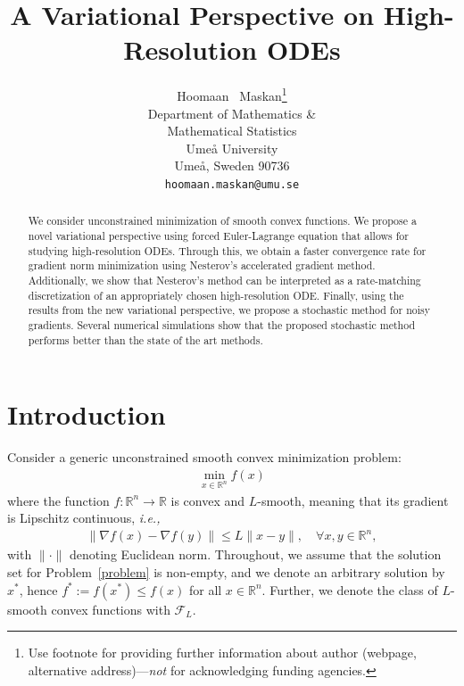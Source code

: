 \documentclass{article}
\title{A Variational Perspective on High-Resolution ODEs}
\author{%
  Hoomaan ~Maskan\thanks{Use footnote for providing further information
    about author (webpage, alternative address)---\emph{not} for acknowledging
    funding agencies.} \\
  Department of Mathematics \& \\Mathematical Statistics\\
  Umeå University\\
  Umeå, Sweden 90736 \\
  \texttt{hoomaan.maskan@umu.se} \\
}
\theoremstyle{plain}
\theoremstyle{definition}
\theoremstyle{remark}
\begin{document}
\maketitle


\begin{abstract}
We consider unconstrained minimization of smooth convex functions. We propose a novel variational perspective using forced Euler-Lagrange equation that allows for studying high-resolution ODEs. Through this, we obtain a faster convergence rate for gradient norm minimization using Nesterov's accelerated gradient method. Additionally, we show that Nesterov's method can be interpreted as a rate-matching discretization of an appropriately chosen high-resolution ODE. Finally, using the results from the new variational perspective, we propose a stochastic method for noisy gradients. Several numerical simulations show that the proposed stochastic method performs better than the state of the art methods.
\end{abstract}


\section{Introduction}

Consider a generic unconstrained smooth convex minimization problem:
\begin{align}\label{problem}
    \min_{x\in \mathbb{R}^n} f(x)
\end{align}
where the function $f:\mathbb{R}^n\rightarrow \mathbb{R}$ is convex and $L$-smooth, meaning that its gradient is Lipschitz continuous, \emph{i.e.,}
\begin{align}\label{cvx-smthness}
\|\nabla f(x)-\nabla f(y)\|\leq L \|x-y\|, \quad \forall x, y \in \mathbb{R}^n,
\end{align}
with $\|\cdot\|$ denoting Euclidean norm. 
Throughout, we assume that the solution set for Problem~\eqref{problem} is non-empty, and we denote an arbitrary solution by $x^*$, hence $f^* := f(x^*) \leq f(x)$ for all $x \in \mathbb{R}^n$. Further, we denote the class of \(L\)-smooth convex functions with \(\mathcal{F}_L\).  
\end{document}
